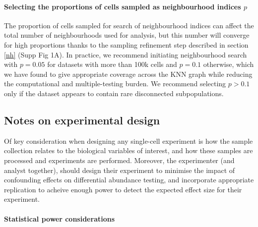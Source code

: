 \documentclass[
]{article}
\begin{document}
\hypertarget{selecting-the-proportions-of-cells-sampled-as-neighbourhood-indices-p}{%
\paragraph*{\texorpdfstring{Selecting the proportions of cells sampled as neighbourhood indices \(p\)}{Selecting the proportions of cells sampled as neighbourhood indices p}}\label{selecting-the-proportions-of-cells-sampled-as-neighbourhood-indices-p}}

The proportion of cells sampled for search of neighbourhood indices can affect the total number of neighbourhoods used for analysis, but this number will converge for high proportions thanks to the sampling refinement step described in section \ref{nh} (Supp Fig 1A). In practice, we recommend initiating neighbourhood search with \(p=0.05\) for datasets with more than 100k cells and \(p=0.1\) otherwise, which we have found to give appropriate coverage across the KNN graph while reducing the computational and multiple-testing burden. We recommend selecting \(p > 0.1\) only if the dataset appears to contain rare disconnected subpopulations.

\hypertarget{notes-on-experimental-design}{%
\subsection{Notes on experimental design}\label{notes-on-experimental-design}}

Of key consideration when designing any single-cell experiment is how the sample collection relates to the biological variables of interest, and how these samples
are processed and experiments are performed. Moreover, the experimenter (and analyst together), should design their experiment to minimise the impact of confounding
effects on differential abundance testing, and incorporate appropriate replication to acheive enough power to detect the expected effect size for their
experiment.

\hypertarget{statistical-power-considerations}{%
\paragraph*{Statistical power considerations}\label{statistical-power-considerations}}
\end{document}
